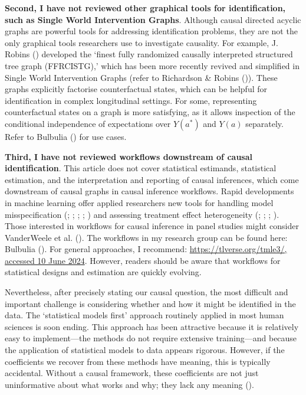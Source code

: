 \documentclass[
  single column]{article}
\begin{document}
\textbf{Second, I have not reviewed other graphical tools for
identification, such as Single World Intervention Graphs}. Although
causal directed acyclic graphs are powerful tools for addressing
identification problems, they are not the only graphical tools
researchers use to investigate causality. For example, J. Robins
() developed the `finest fully randomized
causally interpreted structured tree graph (FFRCISTG),' which has been
more recently revived and simplified in Single World Intervention Graphs
(refer to Richardson \& Robins
()). These graphs
explicitly factorise counterfactual states, which can be helpful for
identification in complex longitudinal settings. For some, representing
counterfactual states on a graph is more satisfying, as it allows
inspection of the conditional independence of expectations over
\(Y(a^*)\) and \(Y(a)\) separately. Refer to Bulbulia
() for use cases.

\textbf{Third, I have not reviewed workflows downstream of causal
identification}. This article does not cover statistical estimands,
statistical estimation, and the interpretation and reporting of causal
inferences, which come downstream of causal graphs in causal inference
workflows. Rapid developments in machine learning offer applied
researchers new tools for handling model misspecification
(;
;
;
;
) and assessing
treatment effect heterogeneity (; ;
;
). Those interested in
workflows for causal inference in panel studies might consider
VanderWeele et al. (). The workflows
in my research group can be found here: Bulbulia
(). For general approaches, I
recommend: \href{https://tlverse.org/tmle3/}{https://tlverse.org/tmle3/,
accessed 10 June 2024}. However, readers should be aware that workflows
for statistical designs and estimation are quickly evolving.

Nevertheless, after precisely stating our causal question, the most
difficult and important challenge is considering whether and how it
might be identified in the data. The `statistical models first' approach
routinely applied in most human sciences is soon ending. This approach
has been attractive because it is relatively easy to implement---the
methods do not require extensive training---and because the application
of statistical models to data appears rigorous. However, if the
coefficients we recover from these methods have meaning, this is
typically accidental. Without a causal framework, these coefficients are
not just uninformative about what works and why; they lack any meaning
().
\end{document}
